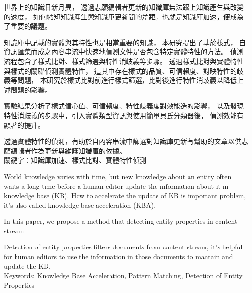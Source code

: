 \begin{abstractzh}

世界上的知識日新月異，
透過志願編輯者更新的知識庫無法跟上知識產生與改變的速度，
如何縮短知識產生與知識庫更新間的差距，也就是知識庫加速，便成為了重要的議題。

知識庫中記載的實體與其特性也是相當重要的知識，
本研究提出了基於樣式，
自資訊匯集而成之內容串流中快速地偵測文件是否包含特定實體特性的方法。
偵測流程包含了樣式比對、樣式篩選與特性消歧義等步驟。
透過樣式比對與實體特性與樣式的關聯偵測實體特性，
這其中存在樣式的品質、可信賴度、對映特性的歧義等問題，
本研究於樣式比對前進行樣式篩選，比對後進行特性消歧義以降低上述問題的影響。

實驗結果分析了樣式信心值、可信賴度、特性歧義度對效能造的影響，
以及發現特性消歧義的步驟中，引入實體類型資訊與使用簡單貝氏分類器後，
偵測效能有顯著的提升。

透過實體特性的偵測，有助於自內容串流中篩選對知識庫更新有幫助的文章以供志願編輯者作為更新與維護知識庫的依據。\\

\noindent
關鍵字：知識庫加速、樣式比對、實體特性偵測

\end{abstractzh}

\begin{abstracten}

World knowledge varies with time, 
but new knowledge about an entity often waits a long time before 
a human editor update the information about it in knowledge base (KB).
How to accelerate the update of KB is important problem, 
it's also called knowledge base acceleration (KBA).

In this paper, we propose a method that detecting entity properties 
in content stream 


Detection of entity properties filters documents from content stream,
it's helpful for human editors to use the information in those documents to mantain and update the KB.\\

\noindent
Keywords: Knowledge Base Acceleration, Pattern Matching, Detection of Entity Properties
\end{abstracten}

